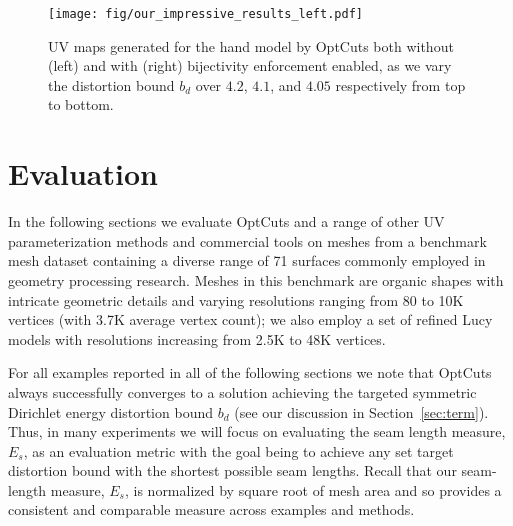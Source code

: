 \begin{figure}[t]
\centering
\texttt{[image: fig/our\_impressive\_results\_left.pdf]}
\vspace{-.5cm}
\caption{UV maps generated for the hand model by OptCuts both without (left) and with (right) bijectivity enforcement enabled, as we vary the distortion bound $b_d$ over $4.2$, $4.1$, and $4.05$ respectively from top to bottom.}
\vspace{-0.2cm}
\label{fig:ours_various_bounds}
\end{figure}

\section{Evaluation}
\label{sec:results}


In the following sections we evaluate OptCuts and a range of other UV parameterization methods and commercial tools on meshes from a benchmark mesh dataset containing a diverse range of 71 surfaces commonly employed in geometry processing research. Meshes in this benchmark are organic shapes with intricate geometric details and varying resolutions ranging from 80 to 10K vertices (with 3.7K average vertex count); we also employ a set of refined Lucy models with resolutions increasing from 2.5K to 48K vertices.

For all examples reported in all of the following sections we note that OptCuts always successfully converges to a solution achieving the targeted symmetric Dirichlet energy distortion bound $b_d$ (see our discussion in Section~\ref{sec:term}). Thus, in many experiments we will focus on evaluating the seam length measure, $E_{s}$, as an evaluation metric with the goal being to achieve any set target distortion bound with the shortest possible seam lengths. Recall that our seam-length measure, $E_{s}$, is normalized by square root of mesh area and so provides a consistent and comparable measure across examples and methods. 

